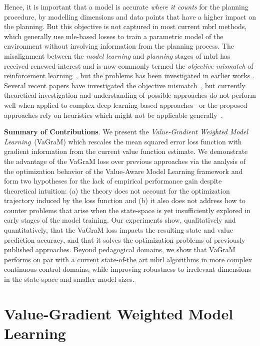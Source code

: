 Hence, it is important that a model is accurate \textit{where it counts} for the planning procedure, by modelling dimensions and data points that have a higher impact on the planning.
But this objective is not captured in most current \ac{mbrl} methods, which generally use \ac{mle}-based losses to train a parametric model of the environment without involving information from the planning process.
The misalignment between the \emph{model learning} and \emph{planning} stages of \ac{mbrl} has received renewed interest and is now commonly termed the \textit{objective mismatch} of reinforcement learning~\parencite{lambert202objective}, but the problems has been investigated in earlier works \parencite{joseph2013reinforcement}.
Several recent papers have investigated the objective mismatch~\parencite{abachi2020policy,zhang2021learning,ayoub2020model,grimm2020value,grimm2021proper,nikishin2021control}, but currently theoretical investigation and understanding of possible approaches do not perform well when applied to complex deep learning based approaches~\parencite{lovatto2020decision} or the proposed approaches rely on heuristics which might not be applicable generally~\parencite{nair2020goal}.

\noindent \textbf{Summary of Contributions}. We present the \textit{Value-Gradient Weighted Model Learning}~(VaGraM) which rescales the mean squared error loss function with gradient information from the current value function estimate.
We demonstrate the advantage of the VaGraM loss over previous approaches via the analysis of the optimization behavior of the Value-Aware Model Learning framework \parencite{vaml, itervaml} and form two hypotheses for the lack of empirical performance gain despite theoretical intuition: (a) the theory does not account for the optimization trajectory induced by the loss function and (b) it also does not address how to counter problems that arise when the state-space is yet insufficiently explored in early stages of the model training.
Our experiments show, qualitatively and quantitatively, that the VaGraM loss impacts the resulting state and value prediction accuracy, and that it solves the optimization problems of previously published approaches.
Beyond pedagogical domains, we show that VaGraM performs on par with a current state-of-the art \ac{mbrl} algorithms in more complex continuous control domains, while improving robustness to irrelevant dimensions in the state-space and smaller model sizes.



\section{Value-Gradient Weighted Model Learning}
\label{sec:vagram:method}

